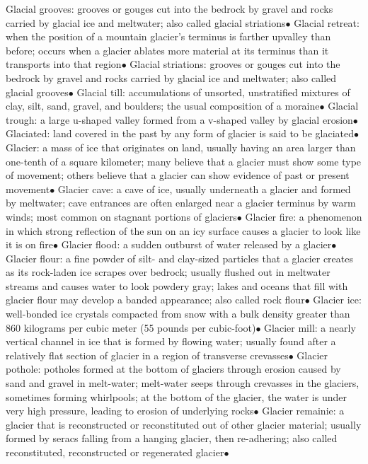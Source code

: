 \documentclass{article}
\newcommand{\ddd}{$\bullet$}
\begin{document}
\begin{multicols*}{4}
        Glacial grooves: grooves or gouges cut into the bedrock by gravel and rocks carried by glacial ice and meltwater; also called glacial striations\ddd
        Glacial retreat: when the position of a mountain glacier's terminus is farther upvalley than before; occurs when a glacier ablates more material at its terminus than it transports into that region\ddd
        Glacial striations: grooves or gouges cut into the bedrock by gravel and rocks carried by glacial ice and meltwater; also called glacial grooves\ddd
        Glacial till: accumulations of unsorted, unstratified mixtures of clay, silt, sand, gravel, and boulders; the usual composition of a moraine\ddd
        Glacial trough: a large u-shaped valley formed from a v-shaped valley by glacial erosion\ddd
        Glaciated: land covered in the past by any form of glacier is said to be glaciated\ddd
        Glacier: a mass of ice that originates on land, usually having an area larger than one-tenth of a square kilometer; many believe that a glacier must show some type of movement; others believe that a glacier can show evidence of past or present movement\ddd
        Glacier cave: a cave of ice, usually underneath a glacier and formed by meltwater; cave entrances are often enlarged near a glacier terminus by warm winds; most common on stagnant portions of glaciers\ddd
        Glacier fire: a phenomenon in which strong reflection of the sun on an icy surface causes a glacier to look like it is on fire\ddd
        Glacier flood: a sudden outburst of water released by a glacier\ddd
        Glacier flour: a fine powder of silt- and clay-sized particles that a glacier creates as its rock-laden ice scrapes over bedrock; usually flushed out in meltwater streams and causes water to look powdery gray; lakes and oceans that fill with glacier flour may develop a banded appearance; also called rock flour\ddd
        Glacier ice: well-bonded ice crystals compacted from snow with a bulk density greater than 860 kilograms per cubic meter (55 pounds per cubic-foot)\ddd
        Glacier mill: a nearly vertical channel in ice that is formed by flowing water; usually found after a relatively flat section of glacier in a region of transverse crevasses\ddd
        Glacier pothole: potholes formed at the bottom of glaciers through erosion caused by sand and gravel in melt-water; melt-water seeps through crevasses in the glaciers, sometimes forming whirlpools; at the bottom of the glacier, the water is under very high pressure, leading to erosion of underlying rocks\ddd
        Glacier remainie: a glacier that is reconstructed or reconstituted out of other glacier material; usually formed by seracs falling from a hanging glacier, then re-adhering; also called reconstituted, reconstructed or regenerated glacier\ddd

\end{multicols*}
\end{document}

